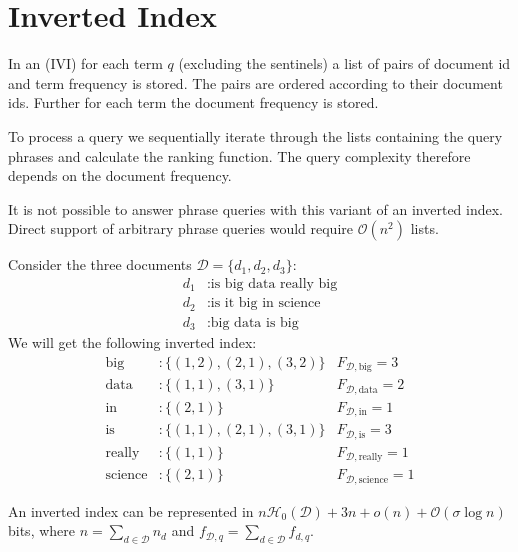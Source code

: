 \section{Inverted Index}

\begin{Definition}
  In an  (IVI) for each term $q$ (excluding the sentinels) a list of pairs of document id and term frequency is stored. The pairs are ordered according to their document ids. Further for each term the document frequency is stored.
\end{Definition}

To process a query we sequentially iterate through the lists containing the query phrases and calculate the ranking function. The query complexity therefore depends on the document frequency.

It is not possible to answer phrase queries with this variant of an inverted index. Direct support of arbitrary phrase queries would require $\mathcal{O}(n^2)$ lists.

\begin{Example}
  Consider the three documents $\mathcal{D} = \{d_1, d_2, d_3\}$:
  \begin{align*}
    d_1 &: \text{is big data really big} \\
    d_2 &: \text{is it big in science} \\
    d_3 &: \text{big data is big}
  \end{align*}
  We will get the following inverted index:
  \begin{align*}
    \text{big} &: \{(1,2), (2,1), (3,2)\}  & F_{\mathcal{D}, \text{big}} = 3 \\
    \text{data} &: \{(1,1), (3,1)\} & F_{\mathcal{D}, \text{data}} = 2 \\
    \text{in} &: \{(2,1)\} & F_{\mathcal{D}, \text{in}} = 1 \\
    \text{is} &: \{(1,1), (2,1), (3,1)\} & F_{\mathcal{D}, \text{is}} = 3 \\
    \text{really} &: \{(1,1)\} & F_{\mathcal{D}, \text{really}} = 1 \\
    \text{science} &: \{(2,1)\} & F_{\mathcal{D}, \text{science}} = 1
  \end{align*}
\end{Example}

\begin{Theorem}
  An inverted index can be represented in $n\mathcal{H}_0(\mathcal{D}) + 3n + o(n) + \mathcal{O}(\sigma \log n)$ bits, where $n = \sum_{d \in \mathcal{D}} n_d$ and $f_{\mathcal{D},q} = \sum_{d \in \mathcal{D}} f_{d,q}$.
\end{Theorem}

